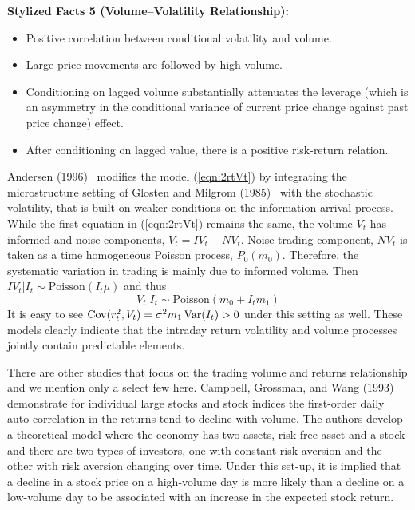 \noindent\textbf{Stylized Facts 5 (Volume--Volatility Relationship):} 

\begin{itemize}
\item  Positive correlation between conditional volatility and volume.

\item Large price movements are followed by high volume.

\item Conditioning on lagged volume substantially attenuates the leverage (which is an asymmetry in the conditional variance of current price change against past price change) effect.

\item After conditioning on lagged value, there is a positive risk-return relation.
\end{itemize}


Andersen (1996)~\cite{andersen} modifies the model (\ref{eqn:2rtVt}) by integrating the microstructure
setting of Glosten and Milgrom (1985)~\cite{glostenmilgrom} with the stochastic volatility, that is built on weaker conditions on the information arrival process. While the first equation in (\ref{eqn:2rtVt}) remains the same, the volume $V_t$ has informed and noise components, $V_t = IV_t + NV_t$. Noise trading component, $NV_t$ is taken as a time homogeneous Poisson process, $P_0(m_0)$. Therefore, the systematic variation in trading is mainly due to informed volume. Then $IV_t|I_t \sim \text{Poisson}(I_t\mu)$ and thus
	\begin{equation}\label{eqn:2VtIt}
	V_t|I_t \sim \text{Poisson}(m_0 + I_t m_1)
	\end{equation}
It is easy to see $\operatorname{Cov}(r_t^2,V_t) = \sigma^2m_1 \operatorname{Var}(I_t) > 0$ under this setting as well. These models clearly indicate that the intraday return volatility and volume processes jointly contain predictable elements.


There are other studies that focus on the trading volume and returns relationship and we mention only a select few here. Campbell, Grossman, and Wang (1993)~\cite{campbellgross} demonstrate for individual large stocks and stock indices the first-order daily auto-correlation in the returns tend to decline with volume. The authors develop a theoretical model where the economy has two assets, risk-free asset and a stock and there are two types of investors, one with constant risk aversion and the other with risk aversion changing over time. Under this set-up, it is implied that a decline in a stock price on a high-volume day is more likely than a decline on a low-volume day to be associated with an increase in the expected stock return.


